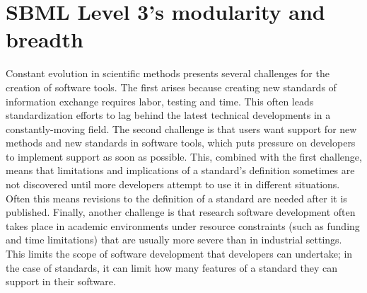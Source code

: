 \documentclass[]{draft-sbml-paper}
\begin{document}
\section*{SBML Level 3's modularity and breadth}\label{sec:modularity}

Constant evolution in scientific methods presents several challenges for the creation of software tools.  The first arises because creating new standards of information exchange requires labor, testing and time.  This often leads standardization efforts to lag behind the latest technical developments in a constantly-moving field.  The second challenge is that users want support for new methods and new standards in software tools, which puts pressure on developers to implement support as soon as possible.  This, combined with the first challenge, means that limitations and implications of a standard's definition sometimes are not discovered until more developers attempt to use it in different situations.  Often this means revisions to the definition of a standard are needed after it is published.  Finally, another challenge is that research software development often takes place in academic environments under resource constraints (such as funding and time limitations) that are usually more severe than in industrial settings.  This limits the scope of software development that developers can undertake; in the case of standards, it can limit how many features of a standard they can support in their software.
\end{document}
